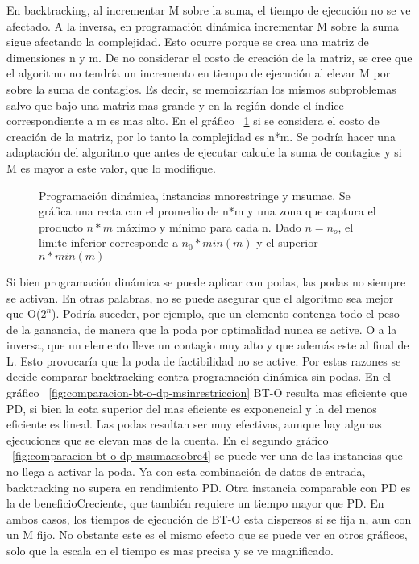 \documentclass[10pt,a4paper]{article}
\begin{document}
En backtracking, al incrementar M sobre la suma, el tiempo de ejecución no se ve afectado. A la inversa, en programación dinámica incrementar M sobre la suma sigue afectando la complejidad. Esto ocurre porque se crea una matriz de dimensiones n y m. De no considerar el costo de creación de la matriz, se cree que el algoritmo no tendría un incremento en tiempo de ejecución al elevar M por sobre la suma de contagios. Es decir, se memoizarían los mismos subproblemas salvo que bajo una matriz mas grande y en la región donde el índice correspondiente a m es mas alto. En el gráfico ~\ref{fig:dp-mnorestringe-msumac} si se considera el costo de creación de la matriz, por lo tanto la complejidad es n*m. Se podría hacer una adaptación del algoritmo que antes de ejecutar calcule la suma de contagios y si M es mayor a este valor, que lo modifique. 

\begin{figure}[H]
    \centering
    
    \caption{Programación dinámica, instancias mnorestringe y msumac. Se gráfica una recta con el promedio de n*m y una zona que captura el producto $n*m$ máximo y mínimo para cada n. Dado $n=n_o$, el limite inferior corresponde a $n_0*min(m)$ y el superior $n*min(m)$}
    \label{fig:dp-mnorestringe-msumac}
\end{figure}

Si bien programación dinámica se puede aplicar con podas, las podas no siempre se activan. En otras palabras, no se puede asegurar que el algoritmo sea mejor que O($2^n$). Podría suceder, por ejemplo, que un elemento contenga todo el peso de la ganancia, de manera que la poda por optimalidad nunca se active. O a la inversa, que un elemento lleve un contagio muy alto y que además este al final de L. Esto provocaría que la poda de factibilidad no se active. Por estas razones se decide comparar backtracking contra programación dinámica sin podas. En el gráfico ~\ref{fig:comparacion-bt-o-dp-msinrestriccion} BT-O resulta mas eficiente que PD, si bien la cota superior del mas eficiente es exponencial y la del menos eficiente es lineal. Las podas resultan ser muy efectivas, aunque hay algunas ejecuciones que se elevan mas de la cuenta. En el segundo gráfico ~\ref{fig:comparacion-bt-o-dp-msumacsobre4} se puede ver una de las instancias que no llega a activar la poda. Ya con esta combinación de datos de entrada, backtracking no supera en rendimiento PD. Otra instancia comparable con PD es la de beneficioCreciente, que también requiere un tiempo mayor que PD. En ambos casos, los tiempos de ejecución de BT-O esta dispersos si se fija n, aun con un M fijo. No obstante este es el mismo efecto que se puede ver en otros gráficos, solo que la escala en el tiempo es mas precisa y se ve magnificado.
\end{document}
